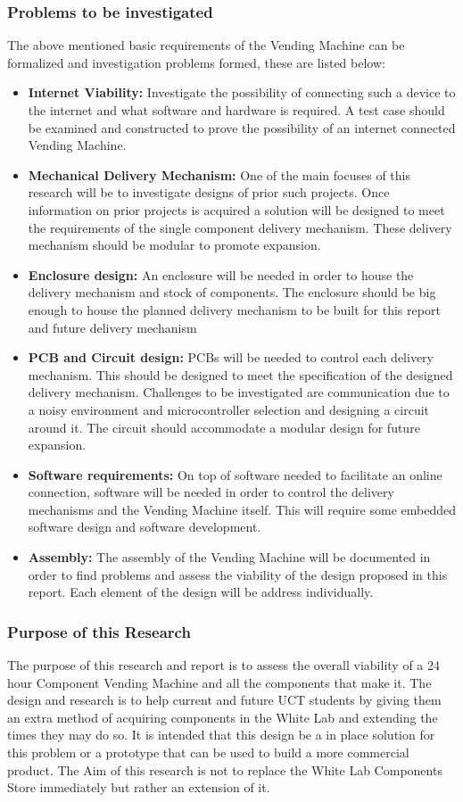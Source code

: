\documentclass[a4paper,11pt]{article}
\numberwithin{figure}{section}
\numberwithin{table}{section}
\begin{document}
		\subsubsection{Problems to be investigated}
The above mentioned basic requirements of the Vending Machine can be formalized and investigation problems formed, these are listed below:
\begin{itemize}
\item \textbf{Internet Viability:} Investigate the possibility of connecting such a device to the internet and what software and hardware is required. A test case should be examined and constructed to prove the possibility of an internet connected Vending Machine.
\item \textbf{Mechanical Delivery Mechanism:} One of the main focuses of this research will be to investigate designs of prior such projects. Once information on prior projects is acquired a solution will be designed to meet the requirements of the single component delivery mechanism. These delivery mechanism should be modular to promote expansion.
\item \textbf{Enclosure design:} An enclosure will be needed in order to house the delivery mechanism and stock of components. The enclosure should be big enough to house the planned delivery mechanism to be built for this report and future delivery mechanism
\item \textbf{PCB and Circuit design:} PCBs will be needed to control each delivery mechanism. This should be designed to meet the specification of the designed delivery mechanism. Challenges to be investigated are communication due to a noisy environment and microcontroller selection and designing a circuit around it. The circuit should accommodate a modular design for future expansion.
\item \textbf{Software requirements:} On top of software needed to facilitate an online connection, software will be needed in order to control the delivery mechanisms and the Vending Machine itself. This will require some embedded software design and software development. 
\item \textbf{Assembly:} The assembly of the Vending Machine will be documented in order to find problems and assess the viability of the design proposed in this report. Each element of the design will be address individually.
\end{itemize}
		\subsubsection{Purpose of this Research}
The purpose of this research and report is to assess the overall viability of a 24 hour Component Vending Machine and all the components that make it. The design and research is to help current and future UCT students by giving them an extra method of acquiring components in the White Lab and extending the times they may do so. It is intended that this design be a in place solution for this problem or a prototype that can be used to build a more commercial product. The Aim of this research is not to replace the White Lab Components Store immediately but rather an extension of it.
\end{document}
